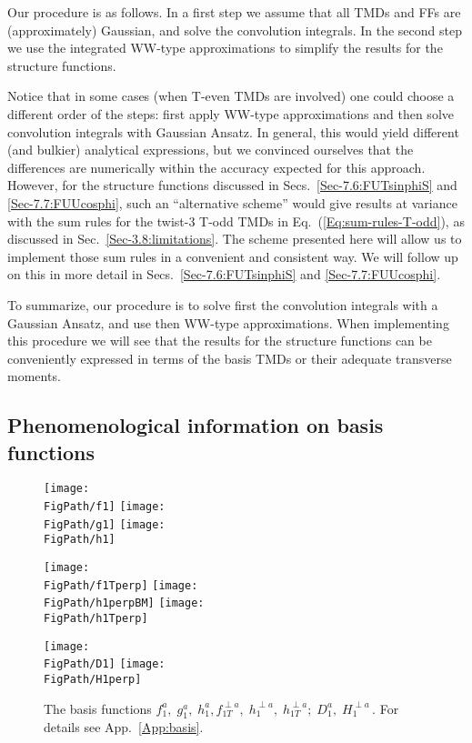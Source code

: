 \documentclass[a4paper,11pt]{article}
\newcommand*{\FigPath}{./figs}%
\begin{document}
Our procedure is as follows. In a first step we assume that all TMDs and 
FFs are (approximately) Gaussian, and solve the convolution integrals.
In the second step we use the integrated WW-type approximations to
simplify the results for the structure functions.

Notice that in some cases (when T-even TMDs are involved) 
one could choose a different order of the steps: first apply 
WW-type approximations and then solve convolution integrals 
with Gaussian Ansatz.
In general, this would yield different (and bulkier) analytical 
expressions, but we convinced ourselves that the differences 
are numerically within the accuracy expected for this approach.
However, for the structure functions discussed in
Secs.~\ref{Sec-7.6:FUTsinphiS} and \ref{Sec-7.7:FUUcosphi},
such an ``alternative scheme'' would give results at
variance with the sum rules for the twist-3 T-odd TMDs
in Eq.~(\ref{Eq:sum-rules-T-odd}), as discussed in 
Sec.~\ref{Sec-3.8:limitations}. 
The scheme presented here will allow us to implement those sum 
rules in a convenient and consistent way. We will follow up on 
this in more detail in 
Secs.~\ref{Sec-7.6:FUTsinphiS} and \ref{Sec-7.7:FUUcosphi}.

To summarize, our procedure is to solve first the convolution 
integrals with a Gaussian Ansatz, and use then WW-type approximations.
When implementing this procedure we will see that the results 
for the structure functions can be conveniently expressed in 
terms of the basis TMDs or their adequate transverse moments. 

\subsection{Phenomenological information on basis functions}
\label{Sec-4.3:plot-basis-functions}

\begin{figure}[b!]
\centering
\texttt{[image: \\FigPath/f1]} 
\texttt{[image: \\FigPath/g1]}  
\texttt{[image: \\FigPath/h1]}  

\texttt{[image: \\FigPath/f1Tperp]}
\texttt{[image: \\FigPath/h1perpBM]}  
\texttt{[image: \\FigPath/h1Tperp]}

\texttt{[image: \\FigPath/D1]} 
\texttt{[image: \\FigPath/H1perp]} 
\caption{\label{basis} 
	The basis functions $f_1^a, \; g_1^a, \; h_1^a, 
	f_{1T}^{\perp a}, \;h_1^{\perp a},\; h_{1T}^{\perp a}; \; 
	D_1^a, \; H_1^{\perp a} \,$. For details see App.~\ref{App:basis}.}
\end{figure}
\end{document}
